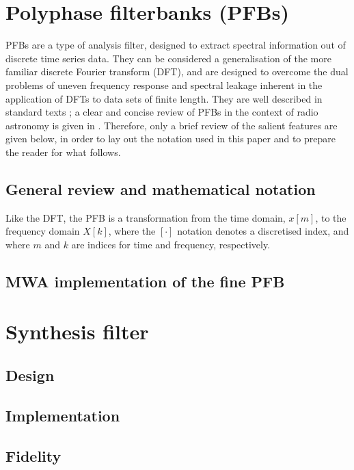 \documentclass{pasa}%
\begin{document}
\section{Polyphase filterbanks (PFBs)}
\label{sec:pfb}

PFBs are a type of analysis filter, designed to extract spectral information out of discrete time series data.
They can be considered a generalisation of the more familiar discrete Fourier transform (DFT), and are designed to overcome the dual problems of uneven frequency response and spectral leakage inherent in the application of DFTs to data sets of finite length.
They are well described in standard texts \citep{Crochiere1983,Harris2004,Oppenheim2009}; a clear and concise review of PFBs in the context of radio astronomy is given in \citet{Harris2011}.
Therefore, only a brief review of the salient features are given below, in order to lay out the notation used in this paper and to prepare the reader for what follows.

\subsection{General review and mathematical notation}

Like the DFT, the PFB is a transformation from the time domain, $x[m]$, to the frequency domain $X[k]$, where the $[\cdot]$ notation denotes a discretised index, and where $m$ and $k$ are indices for time and frequency, respectively.

\subsection{MWA implementation of the fine PFB}

\section{Synthesis filter}
\label{sec:ipfb}

\subsection{Design}

\subsection{Implementation}

\subsection{Fidelity}
\end{document}
